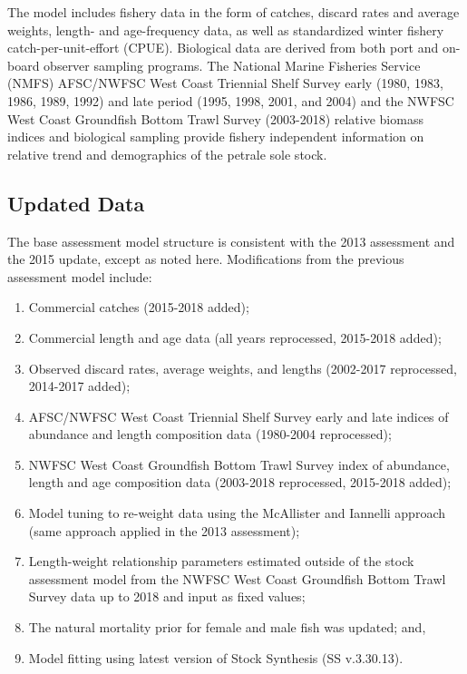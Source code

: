 \documentclass[12pt,]{article}
\begin{document}
The model includes fishery data in the form of catches, discard rates
and average weights, length- and age-frequency data, as well as
standardized winter fishery catch-per-unit-effort (CPUE). Biological
data are derived from both port and on-board observer sampling programs.
The National Marine Fisheries Service (NMFS) AFSC/NWFSC West Coast
Triennial Shelf Survey early (1980, 1983, 1986, 1989, 1992) and late
period (1995, 1998, 2001, and 2004) and the NWFSC West Coast Groundfish
Bottom Trawl Survey (2003-2018) relative biomass indices and biological
sampling provide fishery independent information on relative trend and
demographics of the petrale sole stock.

\subsection*{Updated Data}\label{updated-data}

The base assessment model structure is consistent with the 2013
assessment and the 2015 update, except as noted here. Modifications from
the previous assessment model include:

\begin{enumerate}
  \item Commercial catches (2015-2018 added);
  \item Commercial length and age data (all years reprocessed, 2015-2018 added);
  \item Observed discard rates, average weights, and lengths (2002-2017 reprocessed, 2014-2017 added); 
  \item AFSC/NWFSC West Coast Triennial Shelf Survey early and late indices of abundance and length composition data (1980-2004 reprocessed); 
  \item NWFSC West Coast Groundfish Bottom Trawl Survey index of abundance, length and age composition data (2003-2018 reprocessed, 2015-2018 added);
  \item Model tuning to re-weight data using the McAllister and Iannelli approach (same approach applied in the 2013 assessment);
  \item Length-weight relationship parameters estimated outside of the stock assessment model from the NWFSC West Coast Groundfish Bottom Trawl Survey data up to 2018 and input as fixed values;
  \item The natural mortality prior for female and male fish was updated; and,
  \item Model fitting using latest version of Stock Synthesis (SS v.3.30.13). 
\end{enumerate}
\end{document}
